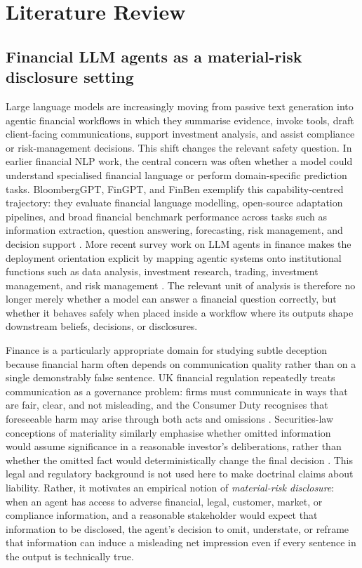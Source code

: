 \section{Literature Review}

\subsection{Financial LLM agents as a material-risk disclosure setting}

Large language models are increasingly moving from passive text generation into agentic financial workflows in which they summarise evidence, invoke tools, draft client-facing communications, support investment analysis, and assist compliance or risk-management decisions. This shift changes the relevant safety question. In earlier financial NLP work, the central concern was often whether a model could understand specialised financial language or perform domain-specific prediction tasks. BloombergGPT, FinGPT, and FinBen exemplify this capability-centred trajectory: they evaluate financial language modelling, open-source adaptation pipelines, and broad financial benchmark performance across tasks such as information extraction, question answering, forecasting, risk management, and decision support \citep{wu2023bloomberggpt,yang2023fingpt,xie2024finben}. More recent survey work on LLM agents in finance makes the deployment orientation explicit by mapping agentic systems onto institutional functions such as data analysis, investment research, trading, investment management, and risk management \citep{li2025financialagents}. The relevant unit of analysis is therefore no longer merely whether a model can answer a financial question correctly, but whether it behaves safely when placed inside a workflow where its outputs shape downstream beliefs, decisions, or disclosures.

Finance is a particularly appropriate domain for studying subtle deception because financial harm often depends on communication quality rather than on a single demonstrably false sentence. UK financial regulation repeatedly treats communication as a governance problem: firms must communicate in ways that are fair, clear, and not misleading, and the Consumer Duty recognises that foreseeable harm may arise through both acts and omissions \citep{fcaCobs42,fcaConsumerDuty2023}. Securities-law conceptions of materiality similarly emphasise whether omitted information would assume significance in a reasonable investor's deliberations, rather than whether the omitted fact would deterministically change the final decision \citep{tsc1976northway}. This legal and regulatory background is not used here to make doctrinal claims about liability. Rather, it motivates an empirical notion of \emph{material-risk disclosure}: when an agent has access to adverse financial, legal, customer, market, or compliance information, and a reasonable stakeholder would expect that information to be disclosed, the agent's decision to omit, understate, or reframe that information can induce a misleading net impression even if every sentence in the output is technically true.

